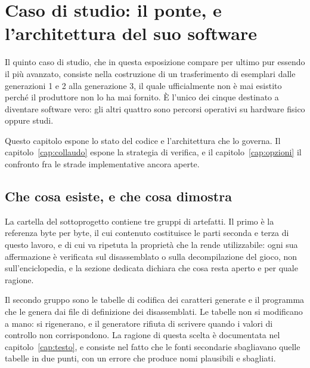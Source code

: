 
\chapter{Caso di studio: il ponte, e l'architettura del suo software}
\label{cap:ponte}

Il quinto caso di studio, che in questa esposizione compare per ultimo pur essendo il più avanzato, consiste nella costruzione di un trasferimento di esemplari dalle generazioni 1 e 2 alla generazione 3, il quale ufficialmente non è mai esistito perché il produttore non lo ha mai fornito. È l'unico dei cinque destinato a diventare software vero: gli altri quattro sono percorsi operativi su hardware fisico oppure studi.

Questo capitolo espone lo stato del codice e l'architettura che lo governa. Il capitolo~\ref{cap:collaudo} espone la strategia di verifica, e il capitolo~\ref{cap:opzioni} il confronto fra le strade implementative ancora aperte.

\section{Che cosa esiste, e che cosa dimostra}

La cartella del sottoprogetto contiene tre gruppi di artefatti. Il primo è la referenza byte per byte, il cui contenuto costituisce le parti seconda e terza di questo lavoro, e di cui va ripetuta la proprietà che la rende utilizzabile: ogni sua affermazione è verificata sul disassemblato o sulla decompilazione del gioco, non sull'enciclopedia, e la sezione dedicata dichiara che cosa resta aperto e per quale ragione.

Il secondo gruppo sono le tabelle di codifica dei caratteri generate e il programma che le genera dai file di definizione dei disassemblati. Le tabelle non si modificano a mano: si rigenerano, e il generatore rifiuta di scrivere quando i valori di controllo non corrispondono. La ragione di questa scelta è documentata nel capitolo~\ref{cap:testo}, e consiste nel fatto che le fonti secondarie sbagliavano quelle tabelle in due punti, con un errore che produce nomi plausibili e sbagliati.


